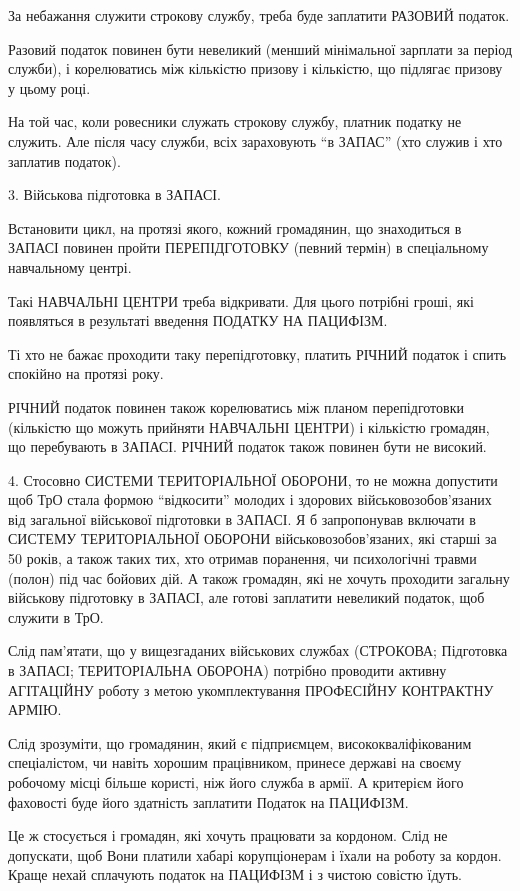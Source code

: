 \begin{itemize}
За небажання служити строкову службу, треба буде заплатити РАЗОВИЙ податок.

Разовий податок повинен бути невеликий (менший мінімальної зарплати за період
служби), і корелюватись між кількістю призову і кількістю, що підлягає призову
у цьому році.

На той час, коли ровесники служать строкову службу, платник податку не служить.
Але після часу служби, всіх зараховують \enquote{в ЗАПАС} (хто служив і хто заплатив
податок).

3. Військова підготовка в ЗАПАСІ.

Встановити цикл, на протязі якого, кожний громадянин, що знаходиться в ЗАПАСІ
повинен пройти ПЕРЕПІДГОТОВКУ (певний термін) в спеціальному навчальному
центрі.

Такі НАВЧАЛЬНІ ЦЕНТРИ треба відкривати. Для цього потрібні гроші, які
появляться в результаті введення ПОДАТКУ НА ПАЦИФІЗМ.

Ті хто не бажає проходити таку перепідготовку, платить РІЧНИЙ податок і спить
спокійно на протязі року.

РІЧНИЙ податок повинен також корелюватись між планом перепідготовки (кількістю
що можуть прийняти НАВЧАЛЬНІ ЦЕНТРИ) і кількістю громадян, що перебувають в
ЗАПАСІ. РІЧНИЙ податок також повинен бути не високий.

4. Стосовно СИСТЕМИ ТЕРИТОРІАЛЬНОЇ ОБОРОНИ, то не можна допустити щоб ТрО стала
формою \enquote{відкосити} молодих і здорових військовозобов'язаних від
загальної військової підготовки в ЗАПАСІ. Я б запропонував включати в СИСТЕМУ
ТЕРИТОРІАЛЬНОЇ ОБОРОНИ військовозобов'язаних, які старші за 50 років, а також
таких тих, хто отримав поранення, чи психологічні травми (полон) під час
бойових дій. А також громадян, які не хочуть проходити загальну військову
підготовку в ЗАПАСІ, але готові заплатити невеликий податок, щоб служити в ТрО.

Слід пам'ятати, що у вищезгаданих військових службах (СТРОКОВА; Підготовка в
ЗАПАСІ; ТЕРИТОРІАЛЬНА ОБОРОНА) потрібно проводити активну АГІТАЦІЙНУ роботу з
метою укомплектування ПРОФЕСІЙНУ КОНТРАКТНУ АРМІЮ.

Слід зрозуміти, що громадянин, який є підприємцем, висококваліфікованим
спеціалістом, чи навіть хорошим працівником, принесе державі на своєму робочому
місці більше користі, ніж його служба в армії. А критерієм його фаховості буде
його здатність заплатити Податок на ПАЦИФІЗМ.

Це ж стосується і громадян, які хочуть працювати за кордоном. Слід не
допускати, щоб Вони платили хабарі корупціонерам і їхали на роботу за кордон.
Краще нехай сплачують податок на ПАЦИФІЗМ і з чистою совістю їдуть.


\end{itemize}
